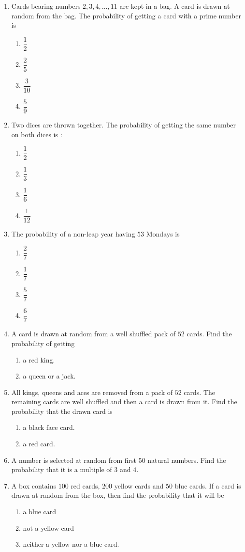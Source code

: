 \begin{enumerate}
\item Cards bearing numbers $2, 3, 4, \ldots, 11$ are kept in a bag. A card is drawn at random from the bag. The probability of getting a card with a prime number is 
\begin{enumerate}
\item $\dfrac{1}{2}$ 
\item $\dfrac{2}{5}$ 
\item $\dfrac{3}{10}$ 
\item $\dfrac{5}{9}$ 
\end{enumerate}
\item Two dices are thrown together. The probability of getting the same number on both dices is : 
\begin{enumerate}
\item $\dfrac{1}{2}$ 
\item $\dfrac{1}{3}$ 
\item $\dfrac{1}{6}$ 
\item $\dfrac{1}{12}$ 
\end{enumerate}
\item The probability of a non-leap year having $53$ Mondays is  
\begin{enumerate}
\item $\dfrac{2}{7}$ 
\item $\dfrac{1}{7}$ 
\item $\dfrac{5}{7}$ 
\item $\dfrac{6}{7}$ 
\end{enumerate}
\item A card is drawn at random from a well shuffled pack of $52$ cards. Find the probability of getting 
\begin{enumerate}[label=\Roman*.]
\item a red king. 
\item a queen or a jack. 
\end{enumerate}
\item All kings, queens and aces are removed from a pack of $52$ cards. The remaining cards are well shuffled and then a card is drawn from it. Find the probability that the drawn card is  
\begin{enumerate}[label=\Roman*.]
\item a black face card. 
\item a red card. 
\end{enumerate}

\item A number is selected at random from first $50$ natural numbers. Find the probability that it is a multiple of $3$ and $4$. 
\item A box contains $100$ red cards, $200$ yellow cards and $50$ blue cards. If a card is drawn at random from the box, then find the probability that it will be \begin{enumerate}[label=\Roman*.]
\item a blue card
\item not a yellow card
\item neither a yellow nor a blue card. 
\end{enumerate}


\end{enumerate}
